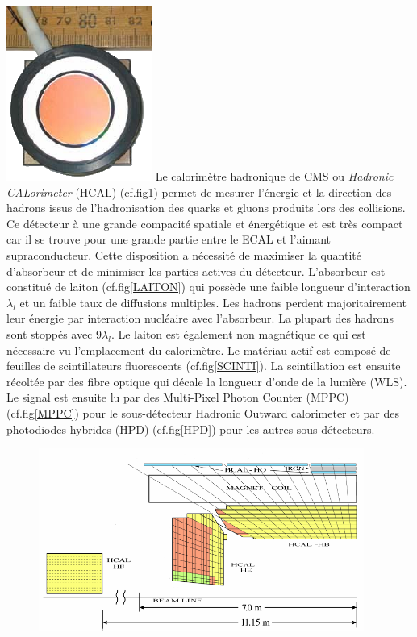 \marginpar
{
	\centering
	\includegraphics[width=\marginparwidth]{CMS/HPD.png}
	\label{HPD}
}
Le calorimètre hadronique de CMS ou \textit{Hadronic CALorimeter} (HCAL) (cf.fig\ref{HCAL}) permet de mesurer l'énergie et la direction des hadrons issus de l'hadronisation des quarks et gluons produits lors des collisions. Ce détecteur à une grande compacité spatiale et énergétique et est très compact car il se trouve pour une grande partie entre le ECAL et l'aimant supraconducteur. Cette disposition a nécessité de maximiser la quantité d'absorbeur et de minimiser les parties actives du détecteur. L'absorbeur est constitué de laiton (cf.fig\ref{LAITON}) qui possède une faible longueur d'interaction $\lambda_{l}$ et un faible taux de diffusions multiples. Les hadrons perdent majoritairement leur énergie par interaction nucléaire avec l'absorbeur. La plupart des hadrons sont stoppés avec 9$\lambda_{l}$. Le laiton est également non magnétique ce qui est nécessaire vu l'emplacement du calorimètre. Le matériau actif est composé de feuilles de scintillateurs fluorescents (cf.fig\ref{SCINTI}). La scintillation est ensuite récoltée par des fibre optique qui décale la longueur d'onde de la lumière (WLS). Le signal est ensuite lu par des Multi-Pixel Photon Counter (MPPC) (cf.fig\ref{MPPC}) pour le sous-détecteur Hadronic Outward calorimeter et par des photodiodes hybrides (HPD) (cf.fig\ref{HPD}) pour les autres sous-détecteurs.
\begin{figure}[ht!]
	\centering
	\includegraphics[width=0.95\textwidth]{CMS/HCALSCHEME.png}
	\label{HCAL}
\end{figure}

